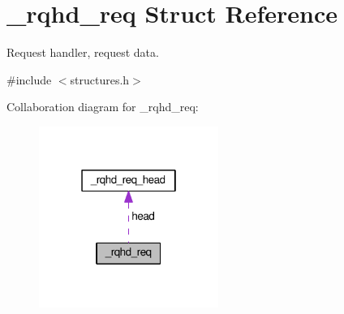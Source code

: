 \hypertarget{struct__rqhd__req}{}\section{\+\_\+rqhd\+\_\+req Struct Reference}
\label{struct__rqhd__req}


Request handler, request data.  




{\ttfamily \#include $<$structures.\+h$>$}



Collaboration diagram for \+\_\+rqhd\+\_\+req\+:
\nopagebreak
\begin{figure}[H]
\begin{center}
\leavevmode
\includegraphics[width=166pt]{struct__rqhd__req__coll__graph}
\end{center}
\end{figure}
